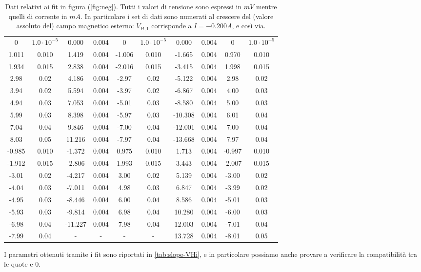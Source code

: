 \begin{table}
\begin{tabular}{cccccccccc}
\hline
0 & $1.0 \cdot 10^{-5}$ & 0.000 & 0.004 & 0 & $1.0 \cdot 10^{-5}$ & 0.000 & 0.004 & 0 & $1.0 \cdot 10^{-5}$\\
1.011 & 0.010 & 1.419 & 0.004 & -1.006 & 0.010 & -1.665 & 0.004 & 0.970 & 0.010\\
1.934 & 0.015 & 2.838 & 0.004 & -2.016 & 0.015 & -3.415 & 0.004 & 1.998 & 0.015\\
2.98 & 0.02 & 4.186 & 0.004 & -2.97 & 0.02 & -5.122 & 0.004 & 2.98 & 0.02\\
3.94 & 0.02 & 5.594 & 0.004 & -3.97 & 0.02 & -6.867 & 0.004 & 4.00 & 0.03\\
4.94 & 0.03 & 7.053 & 0.004 & -5.01 & 0.03 & -8.580 & 0.004 & 5.00 & 0.03\\
5.99 & 0.03 & 8.398 & 0.004 & -5.97 & 0.03 & -10.308 & 0.004 & 6.01 & 0.04\\
7.04 & 0.04 & 9.846 & 0.004 & -7.00 & 0.04 & -12.001 & 0.004 & 7.00 & 0.04\\
8.03 & 0.05 & 11.216 & 0.004 & -7.97 & 0.04 & -13.668 & 0.004 & 7.97 & 0.04\\
-0.985 & 0.010 & -1.372 & 0.004 & 0.975 & 0.010 & 1.713 & 0.004 & -0.997 & 0.010\\
-1.912 & 0.015 & -2.806 & 0.004 & 1.993 & 0.015 & 3.443 & 0.004 & -2.007 & 0.015\\
-3.01 & 0.02 & -4.217 & 0.004 & 3.00 & 0.02 & 5.139 & 0.004 & -3.00 & 0.02\\
-4.04 & 0.03 & -7.011 & 0.004 & 4.98 & 0.03 & 6.847 & 0.004 & -3.99 & 0.02\\
-4.95 & 0.03 & -8.446 & 0.004 & 6.00 & 0.04 & 8.586 & 0.004 & -5.01 & 0.03\\
-5.93 & 0.03 & -9.814 & 0.004 & 6.98 & 0.04 & 10.280 & 0.004 & -6.00 & 0.03\\
-6.98 & 0.04 & -11.227 & 0.004 & 7.98 & 0.04 & 12.003 & 0.004 & -7.01 & 0.04\\
-7.99 & 0.04 & - & - & - & - & 13.728 & 0.004 & -8.01 & 0.05
\end{tabular}
\caption{Dati relativi ai fit in figura (\ref{fig:neg}). Tutti i valori di tensione sono espressi in $ \unit{mV} $ mentre quelli di corrente in $ \unit{mA} $. In particolare i set di dati sono numerati al crescere del (valore assoluto del) campo magnetico esterno: $ V_{H,1} $ corrisponde a $ I=-0.200 \unit{A} $, e così via.}
\label{tab:neg}
\end{table}

I parametri ottenuti tramite i fit sono riportati in \cref{tab:slope-VHi}, e in particolare possiamo anche provare a verificare la compatibilità tra le quote e $ 0 $.

